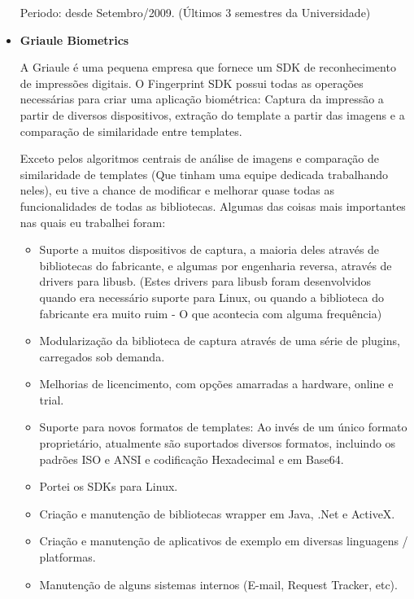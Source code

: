 \documentclass[a4paper,10pt]{article}
\begin{document}
\begin{itemize}
        Periodo: desde Setembro/2009. {\small(Últimos 3 semestres da Universidade)}

      \item  
        \textbf{Griaule Biometrics}

        A Griaule é uma pequena empresa que fornece um SDK de reconhecimento de impressões digitais. O Fingerprint SDK possui todas as operações necessárias para criar uma aplicação biométrica: Captura da impressão a partir de diversos dispositivos, extração do template a partir das imagens e a comparação de similaridade entre templates.

        Exceto pelos algoritmos centrais de análise de imagens e comparação de similaridade de templates (Que tinham uma equipe dedicada trabalhando neles), eu tive a chance de modificar e melhorar quase todas as funcionalidades de todas as bibliotecas. Algumas das coisas mais importantes nas quais eu trabalhei foram:
        \begin{itemize}
          \item Suporte a muitos dispositivos de captura, a maioria deles através de bibliotecas do fabricante, e algumas por engenharia reversa, através de drivers para libusb. (Estes drivers para libusb foram desenvolvidos quando era necessário suporte para Linux, ou quando a biblioteca do fabricante era muito ruim - O que acontecia com alguma frequência)
          \item Modularização da biblioteca de captura através de uma série de plugins, carregados sob demanda.
          \item Melhorias de licencimento, com opções amarradas a hardware, online e trial.
          \item Suporte para novos formatos de templates: Ao invés de um único formato proprietário, atualmente são suportados diversos formatos, incluindo os padrões ISO e ANSI e codificação Hexadecimal e em Base64.
          \item Portei os SDKs para Linux.
          \item Criação e manutenção de bibliotecas wrapper em Java, .Net e ActiveX.
          \item Criação e manutenção de aplicativos de exemplo em diversas linguagens / platformas.
          \item Manutenção de alguns sistemas internos (E-mail, Request Tracker, etc).
        \end{itemize}


\end{itemize}
\end{document}
